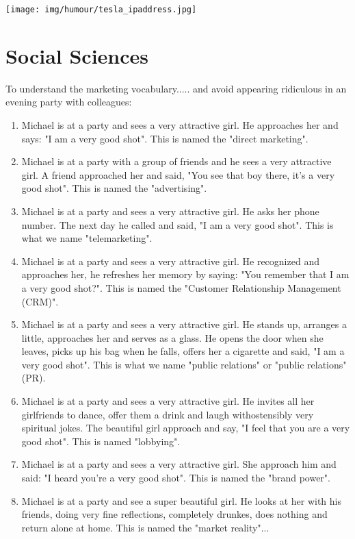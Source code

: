 	\begin{center}
	\texttt{[image: img/humour/tesla\_ipaddress.jpg]}
	\end{center}

	\pagebreak
	\section{Social Sciences}
	
To understand the marketing vocabulary..... and avoid appearing ridiculous in an evening party with colleagues:
\begin{enumerate}
	\item Michael is at a party and sees a very attractive girl. He approaches her and says: "I am a very good shot". This is named the "direct marketing".

	\item Michael is at a party with a group of friends and he sees a very attractive girl. A friend approached her and said, "You see that boy there, it's a very good shot". This is named the "advertising".

	\item Michael is at a party and sees a very attractive girl. He asks her phone number. The next day he called and said, "I am a very good shot". This is what we name "telemarketing".

	\item Michael is at a party and sees a very attractive girl. He recognized and approaches her, he refreshes her memory by saying: "You remember that I am a very good shot?". This is named the "Customer Relationship Management (CRM)".

	\item Michael is at a party and sees a very attractive girl. He stands up, arranges a little, approaches her and serves as a glass. He opens the door when she leaves, picks up his bag when he falls, offers her a cigarette and said, "I am a very good shot". This is what we name "public relations" or "public relations" (PR).

	\item Michael is at a party and sees a very attractive girl. He invites all her girlfriends to dance, offer them a drink and laugh withostensibly very spiritual jokes. The beautiful girl approach and say, "I feel that you are a very good shot". This is named "lobbying".

	\item Michael is at a party and sees a very attractive girl. She approach him and said: "I heard you're a very good shot". This is named the "brand power".

	\item Michael is at a party and see a super beautiful girl. He looks at her with his friends, doing very fine reflections, completely drunkes, does nothing and return alone at home. This is named the "market reality"...
\end{enumerate}

